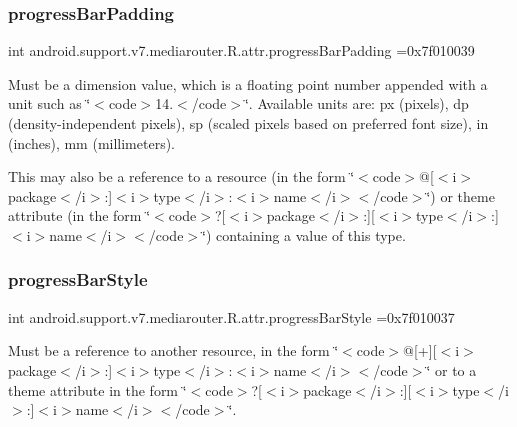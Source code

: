 \subsubsection{\texorpdfstring{progress\+Bar\+Padding}{progressBarPadding}}
{\footnotesize\ttfamily int android.\+support.\+v7.\+mediarouter.\+R.\+attr.\+progress\+Bar\+Padding =0x7f010039\hspace{0.3cm}{\ttfamily [static]}}

Must be a dimension value, which is a floating point number appended with a unit such as \char`\"{}$<$code$>$14.\+5sp$<$/code$>$\char`\"{}. Available units are\+: px (pixels), dp (density-\/independent pixels), sp (scaled pixels based on preferred font size), in (inches), mm (millimeters). 

This may also be a reference to a resource (in the form \char`\"{}$<$code$>$@\mbox{[}$<$i$>$package$<$/i$>$\+:\mbox{]}$<$i$>$type$<$/i$>$\+:$<$i$>$name$<$/i$>$$<$/code$>$\char`\"{}) or theme attribute (in the form \char`\"{}$<$code$>$?\mbox{[}$<$i$>$package$<$/i$>$\+:\mbox{]}\mbox{[}$<$i$>$type$<$/i$>$\+:\mbox{]}$<$i$>$name$<$/i$>$$<$/code$>$\char`\"{}) containing a value of this type. \mbox{\label{classandroid_1_1support_1_1v7_1_1mediarouter_1_1R_1_1attr_a906d7d46aeb18deb13d9cc9c44a9246a}} 
\subsubsection{\texorpdfstring{progress\+Bar\+Style}{progressBarStyle}}
{\footnotesize\ttfamily int android.\+support.\+v7.\+mediarouter.\+R.\+attr.\+progress\+Bar\+Style =0x7f010037\hspace{0.3cm}{\ttfamily [static]}}

Must be a reference to another resource, in the form \char`\"{}$<$code$>$@\mbox{[}+\mbox{]}\mbox{[}$<$i$>$package$<$/i$>$\+:\mbox{]}$<$i$>$type$<$/i$>$\+:$<$i$>$name$<$/i$>$$<$/code$>$\char`\"{} or to a theme attribute in the form \char`\"{}$<$code$>$?\mbox{[}$<$i$>$package$<$/i$>$\+:\mbox{]}\mbox{[}$<$i$>$type$<$/i$>$\+:\mbox{]}$<$i$>$name$<$/i$>$$<$/code$>$\char`\"{}. \mbox{\label{classandroid_1_1support_1_1v7_1_1mediarouter_1_1R_1_1attr_aef2a1d8758be769981a6f328628b5353}} 

